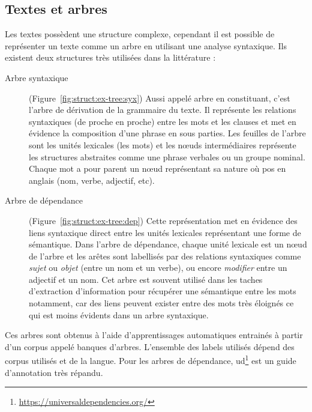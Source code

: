 \subsection{Textes et arbres}

Les textes possèdent une structure complexe, cependant il est possible de représenter un texte comme un arbre en utilisant une analyse syntaxique.
Ils existent deux structures très utilisées dans la littérature :

\begin{description}
    \item[Arbre syntaxique]
          (Figure~\ref{fig:struct:ex-tree:syx})
          Aussi appelé arbre en constituant, c'est l'arbre de dérivation de la grammaire du texte.
          Il représente les relations syntaxiques (de proche en proche) entre les mots et les clauses et met en évidence la composition d'une phrase en sous parties.
          Les feuilles de l'arbre sont les unités lexicales (les mots) et les nœuds intermédiaires représente les structures abstraites comme une phrase verbales ou un groupe nominal.
          Chaque mot a pour parent un nœud représentant sa nature où \gls{pos} en anglais (nom, verbe, adjectif, etc).

    \item[Arbre de dépendance]
          (Figure~\ref{fig:struct:ex-tree:dep})
          Cette représentation met en évidence des liens syntaxique direct entre les unités lexicales représentant une forme de sémantique.
          Dans l'arbre de dépendance, chaque unité lexicale est un nœud de l'arbre et les arêtes sont labellisés par des relations syntaxiques comme \emph{sujet} ou \emph{objet} (entre un nom et un verbe), ou encore \emph{modifier} entre un adjectif et un nom.
          Cet arbre est souvent utilisé dans les taches d'extraction d'information pour récupérer une sémantique entre les mots notamment, car des liens peuvent exister entre des mots très éloignés ce qui est moins évidents dans un arbre syntaxique.
\end{description}

Ces arbres sont obtenus à l'aide d'apprentissages automatiques entrainés à partir d'un corpus appelé banques d'arbres.
L'ensemble des labels utilisés dépend des corpus utilisés et de la langue.
Pour les arbres de dépendance, \gls{ud}\footnote{\url{https://universaldependencies.org/}} est un guide d'annotation très répandu.

